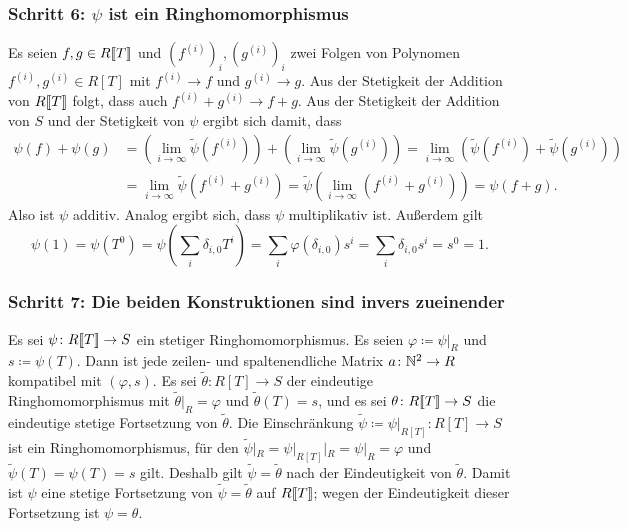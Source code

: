 \documentclass[a4paper, 10pt, numbers=noenddot]{scrartcl}
\begin{document}
\subsubsection*{Schritt 6: $\psi$ ist ein Ringhomomorphismus}
Es seien $f, g \in R[\![T]\!]$ und $(f^{(i)})_i, (g^{(i)})_i$ zwei Folgen von Polynomen $f^{(i)}, g^{(i)} \in R[T]$ mit $f^{(i)} \to f$ und $g^{(i)} \to g$.
Aus der Stetigkeit der Addition von $R[\![T]\!]$ folgt, dass auch $f^{(i)} + g^{(i)} \to f + g$.
Aus der Stetigkeit der Addition von $S$ und der Stetigkeit von $\psi$ ergibt sich damit, dass
\begin{align*}
        \psi(f) + \psi(g)
  &=    \left( \lim_{i \to \infty} \tilde{\psi}\left( f^{(i)} \right) \right)
      + \left( \lim_{i \to \infty} \tilde{\psi}\left( g^{(i)} \right) \right)
   =  \lim_{i \to \infty} \left( \tilde{\psi}\left( f^{(i)} \right) + \tilde{\psi}\left( g^{(i)} \right) \right)
  \\
  &=  \lim_{i \to \infty} \tilde{\psi}\left( f^{(i)} + g^{(i)} \right)
   =  \tilde{\psi}\left( \lim_{i \to \infty} \left( f^{(i)} + g^{(i)} \right) \right)
   =  \psi(f + g).
\end{align*}
Also ist $\psi$ additiv.
Analog ergibt sich, dass $\psi$ multiplikativ ist.
Außerdem gilt
\[
    \psi(1)
  = \psi\left( T^0 \right)
  = \psi\left( \sum_i \delta_{i,0} T^i \right)
  = \sum_i \varphi(\delta_{i,0}) s^i
  = \sum_i \delta_{i,0} s^i
  = s^0
  = 1.
\]


\subsubsection*{Schritt 7: Die beiden Konstruktionen sind invers zueinender}
Es sei $\psi \colon R[\![T]\!] \to S$ ein stetiger Ringhomomorphismus.
Es seien $\varphi \coloneqq \psi|_R$ und $s \coloneqq \psi(T)$.
Dann ist jede zeilen- und spaltenendliche Matrix $a \colon \mathbb{N}^2 \to R$ kompatibel mit $(\varphi, s)$.
Es sei $\tilde{\theta} \colon R[T] \to S$ der eindeutige Ringhomomorphismus mit $\tilde{\theta}|_R = \varphi$ und $\tilde{\theta}(T) = s$, und es sei $\theta \colon R[\![T]\!] \to S$ die eindeutige stetige Fortsetzung von $\tilde{\theta}$.
Die Einschränkung $\tilde{\psi} \coloneqq \psi|_{R[T]} \colon R[T] \to S$ ist ein Ringhomomorphismus, für den $\tilde{\psi}|_R = \psi|_{R[T]}|_R = \psi|_R = \varphi$ und $\tilde{\psi}(T) = \psi(T) = s$ gilt.
Deshalb gilt $\tilde{\psi} = \tilde{\theta}$ nach der Eindeutigkeit von $\tilde{\theta}$.
Damit ist $\psi$ eine stetige Fortsetzung von $\tilde{\psi} = \tilde{\theta}$ auf $R[\![T]\!]$; wegen der Eindeutigkeit dieser Fortsetzung ist $\psi = \theta$.
\end{document}

